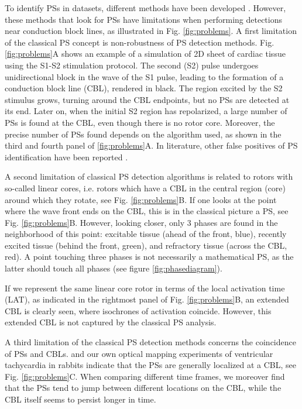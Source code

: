 \documentclass{article}
\begin{document}
To identify PSs in datasets, different methods have been developed \citep{Gray:1998,Fenton:1998,Bray:2003,Clayton:2005,Kuklik:2015,Kuklik:2017}. However, these methods that look for PSs have limitations when performing detections near conduction block lines, as illustrated in Fig. \ref{fig:problems}. 
A first limitation of the classical PS concept is non-robustness of PS detection methods. Fig. \ref{fig:problems}A shows an example of a simulation of 2D sheet of cardiac tissue using the S1-S2 stimulation protocol. The second (S2) pulse undergoes unidirectional block in the wave of the S1 pulse, leading to the formation of a conduction block line (CBL), rendered in black. The region excited by the S2 stimulus grows, turning around the CBL endpoints, but no PSs are detected at its end. Later on, when the initial S2 region has repolarized, a large number of PSs is found at the CBL, even though there is no rotor core. Moreover, the precise number of PSs found depends on the algorithm used, as shown in the third and fourth panel of \ref{fig:problems}A. In literature, other false positives of PS identification have been reported \citep{Podziemski:2018}.

A second limitation of classical PS detection algorithms is related to rotors with so-called linear cores, i.e. rotors which have a CBL in the central region (core) around which they rotate, see Fig. \ref{fig:problems}B. If one looks at the point where the wave front ends on the CBL, this is in the classical picture a PS, see Fig. \ref{fig:problems}B. However, looking closer, only 3 phases are found in the neighborhood of this point: excitable tissue (ahead of the front, blue), recently excited tissue (behind the front, green), and refractory tissue (across the CBL, red). A point touching three phases is not necessarily a mathematical PS, as the latter should touch all phases (see figure \ref{fig:phasediagram}).

If we represent the same linear core rotor in terms of the local activation time (LAT), as indicated in the rightmost panel of Fig. \ref{fig:problems}B, an extended CBL is clearly seen, where isochrones of activation coincide. However, this extended CBL is not captured by the classical PS analysis.  

A third limitation of the classical PS detection methods concerns the coincidence of PSs and CBLs. \cite{Podziemski:2018} and our own optical mapping experiments of ventricular tachycardia in rabbits indicate that the PSs are generally localized at a CBL, see Fig. \ref{fig:problems}C. When comparing different time frames, we moreover find that the PSs tend to jump between different locations on the CBL, while the CBL itself seems to persist longer in time. 
\end{document}
